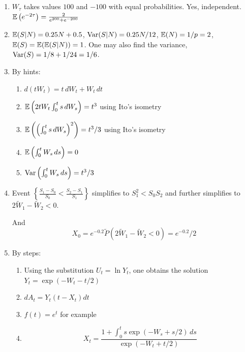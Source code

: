 \documentclass[pdftex,12pt,a4paper]{article}
\begin{document}
\begin{enumerate}
\item $W_{\tau}$ takes values $100$ and $-100$ with equal probabilities. Yes, independent. $\mathbb{E}\left(  e^{-2\tau} \right) = \frac{2}{e^{200}+e^{-200}}$
\item $\mathbb{E}(S|N)=0.25N+0.5$, $\operatorname{Var}(S|N)=0.25N/12$, $\mathbb{E}(N)=1/p=2$, $\mathbb{E}(S)=\mathbb{E}(\mathbb{E}(S|N))=1$. One may also find the variance, $\operatorname{Var}(S)=1/8+1/24=1/6$. 
\item By hints:
\begin{enumerate}
\item $d(tW_t)=t \, dW_t+W_t \, dt$
\item $\mathbb{E}\left(2t W_t\int_0^t s \, dW_s\right)=t^3$ using Ito's isometry
\item $\mathbb{E}\left(\left(\int_0^t s \, dW_s\right)^2 \right)=t^3/3$ using Ito's isometry
\item $\mathbb{E}\left(  \int_0^t W_s \, ds  \right)=0$
\item $\operatorname{Var}\left(  \int_0^t W_s \, ds  \right)=t^3/3$
\end{enumerate}
\item Event $\left\{ \frac{S_1-S_0}{S_0} < \frac{S_2-S_1}{S_1} \right\}$ simplifies to $S_1^2<S_0 S_2$ and further simplifies to $2\tilde{W}_1 - \tilde{W}_2 < 0$.

And 
\[
X_0=e^{-0.2}\tilde{P}(2\tilde{W}_1 - \tilde{W}_2 < 0) = e^{-0.2}/2
\]

\item By steps:

\begin{enumerate}
\item Using the substitution $U_t=\ln Y_t$, one obtains the solution $Y_t=\exp(-W_t-t/2)$
\item $dA_t= Y_t (t-X_t)dt$
\item $f(t)=e^t$ for example
\item 
\[
X_t=\frac{1+\int_0^t s \exp(-W_s+s/2) \, ds}{ \exp(-W_t +t/2 )}
\]
\end{enumerate}


\end{enumerate}
\end{document}
